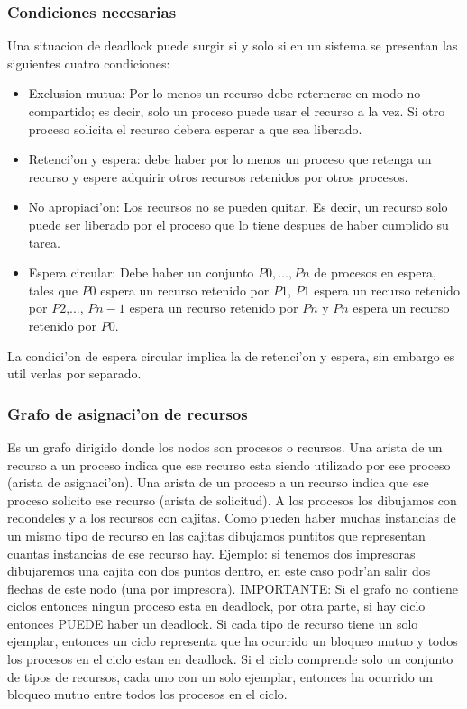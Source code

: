 \subsubsection{Condiciones necesarias}
Una situacion de deadlock puede surgir si y solo si en un sistema se presentan las siguientes cuatro condiciones:
\begin{itemize}
 \item Exclusion mutua: Por lo menos un recurso debe reternerse en modo no compartido; es decir, solo un proceso puede usar el recurso a la vez. Si otro proceso solicita el recurso debera esperar a que sea liberado.
 \item Retenci'on y espera: debe haber por lo menos un proceso que retenga un recurso y espere adquirir otros recursos retenidos por otros procesos.
 \item No apropiaci'on: Los recursos no se pueden quitar. Es decir, un recurso solo puede ser liberado por el proceso que lo tiene despues de haber cumplido su tarea.
 \item Espera circular: Debe haber un conjunto ${P0,...,Pn}$ de procesos en espera, tales que $P0$ espera un recurso retenido por $P1$, $P1$ espera un recurso retenido por $P2$,..., $Pn-1$ espera un recurso retenido por $Pn$ y $Pn$ espera un recurso retenido por $P0$.
\end{itemize}
La condici'on de espera circular implica la de retenci'on y espera, sin embargo es util verlas por separado.

\subsubsection{Grafo de asignaci'on de recursos}
Es un grafo dirigido donde los nodos son procesos o recursos. Una arista de un recurso a un proceso indica que ese recurso esta siendo utilizado por ese proceso (arista de asignaci'on). Una arista de un proceso a un recurso indica que ese proceso solicito ese recurso (arista de solicitud).
A los procesos los dibujamos con redondeles y a los recursos con cajitas. Como pueden haber muchas instancias de un mismo tipo de recurso en las cajitas dibujamos puntitos que representan cuantas instancias de ese recurso hay. Ejemplo: si tenemos dos impresoras dibujaremos una cajita con dos puntos dentro, en este caso podr'an salir dos flechas de este nodo (una por impresora). 
IMPORTANTE: Si el grafo no contiene ciclos entonces ningun proceso esta en deadlock, por otra parte, si hay ciclo entonces PUEDE haber un deadlock.
Si cada tipo de recurso tiene un solo ejemplar, entonces un ciclo representa que ha ocurrido un bloqueo mutuo y todos los procesos en el ciclo estan en deadlock.
Si el ciclo comprende solo un conjunto de tipos de recursos, cada uno con un solo ejemplar, entonces ha ocurrido un bloqueo mutuo entre todos los procesos en el ciclo.

